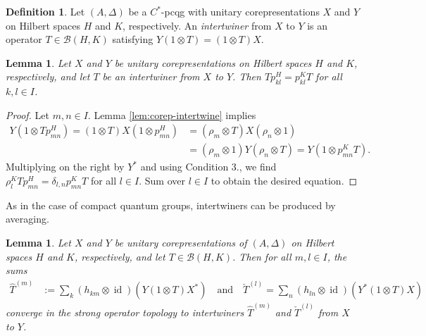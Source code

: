 \documentclass[11pt]{article}
\DeclareMathOperator{\id}{id}
\newtheorem{Lem}[Theorem]{Lemma}
\theoremstyle{definition}
\newtheorem{Def}[Theorem]{Definition}
\numberwithin{equation}{section}
\begin{document}
\begin{Def}
  Let $(A,\Delta)$ be a $C^{*}$-pcqg with unitary corepresentations $X$ and $Y$ on Hilbert spaces
  $H$ and $K$, respectively. An \emph{intertwiner} from $X$ to $Y$ is an operator $T\in
  \mathcal{B}(H,K)$ satisfying $Y(1\otimes T)=(1 \otimes T)X$.
\end{Def}
\begin{Lem} \label{lem:intertwiner-graded}
  Let $X$ and $Y$ be unitary corepresentations on Hilbert spaces $H$ and $K$, respectively, and let
  $T$ be an \emph{intertwiner} from $X$ to $Y$. Then $Tp^{H}_{kl} = p^{K}_{kl}T$ for all $k,l\in I$.
\end{Lem}
\begin{proof}
Let $m,n\in I$. Lemma \ref{lem:corep-intertwine} implies
\begin{align*}
  Y(1\otimes Tp^{H}_{mn}) = (1\otimes T)X(1\otimes p^{H}_{mn}) &= (\rho_{m} \otimes T)X(\rho_{n}
  \otimes 1) \\ &= (\rho_{m} \otimes 1)Y( \rho_{n}\otimes T) = Y(1 \otimes p^{K}_{mn}T).
\end{align*}
Multiplying on the right by $Y^{*}$ and using Condition 3., we find
$\rho^{K}_{l}Tp^{H}_{mn}  = \delta_{l,n} p^{K}_{mn}T$ for all $l \in I$. Sum over $l\in I$ to obtain
the desired equation.
\end{proof}
As in the case of compact quantum groups, intertwiners can be produced
by averaging.
\begin{Lem} \label{lem:intertwiner-averaged}
  Let $X$ and $Y$ be unitary corepresentations of $(A,\Delta)$ on Hilbert spaces $H$ and $K$,
  respectively, and let $T \in \mathcal{B}(H,K)$. Then for all $m,l \in I$, the sums
  \begin{align*}
    \hat T^{(m)} &:= \sum_{k} (h_{km} \otimes \id)(Y(1 \otimes T)X^{*}) \quad \text{and} \quad
    \check T^{(l)}=\sum_{n} (h_{ln}\otimes \id)(Y^{*}(1 \otimes T)X)
  \end{align*}
converge in the strong operator topology to intertwiners $\hat T^{(m)}$ and $\check T^{(l)}$ from $X$ to
$Y$.
\end{Lem}
\end{document}
